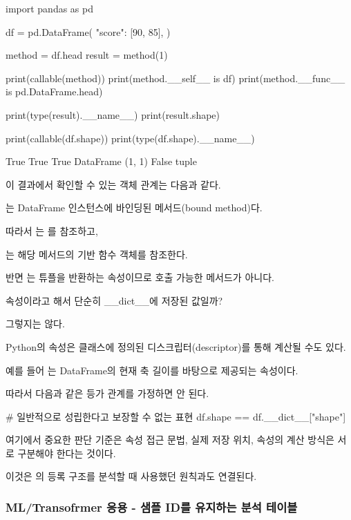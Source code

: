 \begin{dhkcode}
import pandas as pd

df = pd.DataFrame({
    "score": [90, 85],
})

method = df.head
result = method(1)

print(callable(method))
print(method.__self__ is df)
print(method.__func__ is pd.DataFrame.head)

print(type(result).__name__)
print(result.shape)

print(callable(df.shape))
print(type(df.shape).__name__)
\end{dhkcode}

\begin{dhkzsh}
True
True
True
DataFrame
(1, 1)
False
tuple
\end{dhkzsh}

이 결과에서 확인할 수 있는 객체 관계는 다음과 같다.

는 DataFrame 인스턴스에 바인딩된 메서드(bound method)다.

따라서 는 를 참조하고,

는 해당 메서드의 기반 함수 객체를 참조한다.

반면 는 튜플을 반환하는 속성이므로 호출 가능한 메서드가 아니다.

\begin{dhknote}
\begin{dhksmry}[centered]
속성이라고 해서 단순히 __dict__에 저장된 값일까?
\end{dhksmry}
\end{dhknote}

그렇지는 않다.

Python의 속성은 클래스에 정의된 디스크립터(descriptor)를 통해 계산될 수도 있다.

예를 들어 는 DataFrame의 현재 축 길이를 바탕으로 제공되는 속성이다.

따라서 다음과 같은 등가 관계를 가정하면 안 된다.

\begin{dhkcode}
# 일반적으로 성립한다고 보장할 수 없는 표현
df.shape == df.__dict__["shape"]
\end{dhkcode}

여기에서 중요한 판단 기준은 속성 접근 문법, 실제 저장 위치, 속성의 계산 방식은 서로 구분해야 한다는 것이다.

이것은 의  등록 구조를 분석할 때 사용했던 원칙과도 연결된다.

\subsubsection{ML/Transofrmer 응용 - 샘플 ID를 유지하는 분석 테이블}

